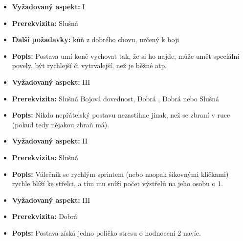 \documentclass[../main.tex]{subfiles}
\begin{document}
\begin{specialita}[Válečný oř, I]
\begin{itemize}
	\item \textbf{Vyžadovaný aspekt:} I
	\item \textbf{Prerekvizita:} Slušná 
	\item \textbf{Další požadavky:} kůň z dobrého chovu, určený k boji
	\item \textbf{Popis:} Postava umí koně vychovat tak, že si ho najde, může umět speciální povely, být rychlejší či vytrvalejší, než je běžné atp.
\end{itemize}
\end{specialita}

\begin{specialita}
\begin{itemize}
	\item \textbf{Vyžadovaný aspekt:} III
	\item \textbf{Prerekvizita:} Slušná Bojová dovednost, Dobrá , Dobrá  nebo Slušná 
	\item \textbf{Popis:} Nikdo nepřátelský postavu nezastihne jinak, než se zbraní v ruce (pokud tedy nějakou zbraň má).
\end{itemize}
\end{specialita}

\begin{specialita}[Zteč, I]
\begin{itemize}
	\item \textbf{Vyžadovaný aspekt:} II
	\item \textbf{Prerekvizita:} Slušná 
	\item \textbf{Popis:} Válečník se rychlým sprintem (nebo naopak šikovnými kličkami) rychle blíží ke střelci, a tím mu sníží počet výstřelů na jeho osobu o 1.
\end{itemize}
\end{specialita}

\begin{specialita}
\begin{itemize}
	\item \textbf{Vyžadovaný aspekt:} III
	\item \textbf{Prerekvizita:} Dobrá 
	\item \textbf{Popis:} Postava získá jedno políčko stresu o hodnocení 2 navíc.
\end{itemize}
\end{specialita}
\end{document}
